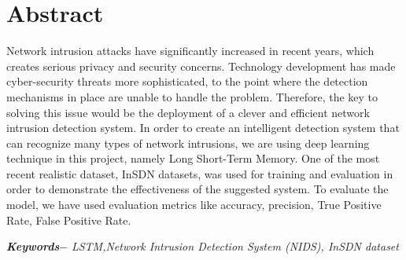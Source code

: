 

\setcounter{tocdepth}{3}
\setcounter{secnumdepth}{3}


\KECcoverpage  
\KECtitlepage
{} %



\chapter*{Abstract} %
Network intrusion attacks have significantly increased in recent years, which creates serious privacy and security concerns. Technology development has made cyber-security threats more sophisticated, to the point where the detection mechanisms in place are unable to handle the problem. Therefore, the key to solving this issue would be the deployment of a clever and efficient network intrusion detection system. In order to create an intelligent detection system that can recognize many types of network intrusions, we are using deep learning technique in this project, namely Long Short-Term Memory. One of the most recent realistic dataset, InSDN datasets, was used for training and evaluation in order to demonstrate the effectiveness of the suggested system. To evaluate the model, we have used evaluation metrics like accuracy, precision, True Positive Rate, False Positive Rate.
\par
\textbf{\textit{Keywords$-$}} \emph{LSTM,Network Intrusion Detection System (NIDS), InSDN dataset}

